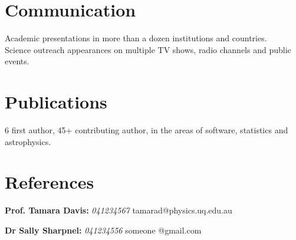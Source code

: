 \documentclass[11pt]{friggeri-cv}
\begin{document}
\section{Communication}
Academic presentations in more than a dozen institutions and countries.
~
Science outreach appearances on multiple TV shows, radio channels and public events.
\section{Publications}
6 first author, 
45+ contributing author, in the areas of software, statistics and astrophysics.

\section{References}

\textbf{Prof. Tamara Davis:} \textit{041234567} {tamarad@physics.uq.edu.au}

\textbf{Dr Sally Sharpnel:} \textit{041234556} {someone @gmail.com}
\end{document}
